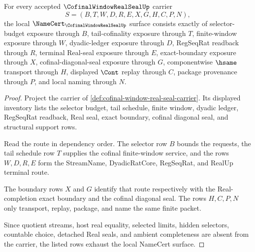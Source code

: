 \begin{theorem}
\label{thm:cofinal-window-real-seal-namecert-obligations}
For every accepted $\CofinalWindowRealSealUp$ carrier
$$
S=(B,T,W,D,R,E,X,G,H,C,P,N),
$$
the local $\NameCert_{\CofinalWindowRealSealUp}$ surface consists exactly of selector-budget exposure through $B$, tail-cofinality exposure through $T$, finite-window exposure through $W$, dyadic-ledger exposure through $D$, RegSeqRat readback through $R$, terminal Real-seal exposure through $E$, exact-boundary exposure through $X$, cofinal-diagonal-seal exposure through $G$, componentwise $\hsame$ transport through $H$, displayed $\Cont$ replay through $C$, package provenance through $P$, and local naming through $N$.
\end{theorem}
\begin{proof}
Project the carrier of \autoref{def:cofinal-window-real-seal-carrier}. Its displayed inventory lists the selector budget, tail schedule, finite window, dyadic ledger, RegSeqRat readback, Real seal, exact boundary, cofinal diagonal seal, and structural support rows.

Read the route in dependency order. The selector row $B$ bounds the requests, the tail schedule row $T$ supplies the cofinal finite-window service, and the rows $W,D,R,E$ form the StreamName, DyadicRatCore, RegSeqRat, and RealUp terminal route.

The boundary rows $X$ and $G$ identify that route respectively with the Real-completion exact boundary and the cofinal diagonal seal. The rows $H,C,P,N$ only transport, replay, package, and name the same finite packet.

Since quotient streams, host real equality, selected limits, hidden selectors, countable choice, detached Real seals, and ambient completeness are absent from the carrier, the listed rows exhaust the local NameCert surface.
\end{proof}

